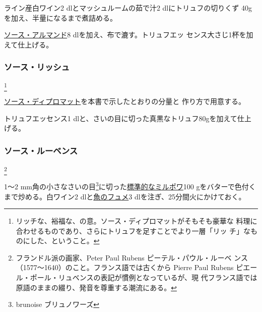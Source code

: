 \begin{recette}
ライン産白ワイン2 dlとマッシュルームの茹で汁2 dlにトリュフの切りくず
40gを加え、半量になるまで煮詰める。

\protect\hyperlink{sauce-allemande}{ソース・アルマンド}8
dlを加え、布で漉す。トリュフエッ センス大さじ1杯を加えて仕上げる。

\hypertarget{sauce-riche}{%
\subsubsection{ソース・リッシュ}\label{sauce-riche}}

\footnote{リッチな、裕福な、の意。ソース・ディプロマットがそもそも豪華な
  料理に合わせるものであり、さらにトリュフを足すことでより一層「リッ
  チ」なものにした、ということ。}

 

\protect\hyperlink{sauce-diplomate}{ソース・ディプロマット}を本書で示したとおりの分量と
作り方で用意する。

トリュフエッセンス1
dlと、さいの目に切った真黒なトリュフ80gを加えて仕上げる。

\maeaki

\hypertarget{sauce-rubens}{%
\subsubsection{ソース・ルーベンス}\label{sauce-rubens}}

\footnote{フランドル派の画家、Peter Paul Rubens
  ピーテル・パウル・ルーベ
  ンス（1577〜1640）のこと。フランス語では古くから Pierre Paul Rubens
  ピエール・ポール・リュベンスの表記が慣例となっているが、現
  代フランス語では原語のままの綴り、発音を尊重する潮流にある。}


1〜2 mm角の小さなさいの目\footnote{brunoise ブリュノワーズ}に切った\protect\hyperlink{}{標準的なミルポワ}100
gをバターで色付くまで炒める。白ワイン2
dlと\protect\hyperlink{fumet-de-poisson}{魚のフュメ}3
dlを注ぎ、25分間火にかけておく。


\end{recette}
